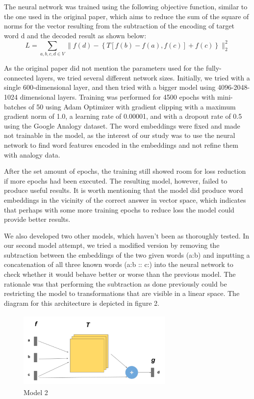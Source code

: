 \documentclass[11pt]{article}
\begin{document}
The neural network was trained using the following objective function,
similar to the one used in the original paper, which aims to reduce the
sum of the square of norms for the vector resulting from the subtraction
of the encoding of target word d and the decoded result as shown below:
$$L=\sum_{a,b,c,d \in V}\| f(d) - \left \{T[f(b)-f(a),f(c)]+f(c)\right \} \|_{2}^2$$

As the original paper did not mention the parameters used for the
fully-connected layers, we tried several different network sizes. Initially, we
tried with a single 600-dimensional layer, and then tried with a bigger model
using 4096-2048-1024 dimensional layers. Training was performed for 4500 epochs
with mini-batches of 50 using Adam Optimizer with gradient clipping with a
maximum gradient norm of 1.0, a learning rate of 0.00001, and with a dropout
rate of 0.5 using the Google Analogy dataset. The word embeddings were fixed and
made not trainable in the model, as the interest of our study was to use the
neural network to find word features encoded in the embeddings and not refine
them with analogy data.

After the set amount of epochs, the training still showed room for loss
reduction if more epochs had been executed. The resulting model, however, failed
to produce useful results. It is worth mentioning that the model did produce
word embeddings in the vicinity of the correct answer in vector space, which
indicates that perhaps with some more training epochs to reduce loss the model
could provide better results.

We also developed two other models, which haven't been as thoroughly tested. In
our second model attempt, we tried a modified version by removing the
subtraction between the embeddings of the two given words (a:b) and inputting a
concatenation of all three known words (a:b :: c:) into the neural network to
check whether it would behave better or worse than the previous model. The
rationale was that performing the subtraction as done previously could be
restricting the model to transformations that are visible in a linear space. The
diagram for this architecture is depicted in figure 2.

\begin{figure}
  \centering
\includegraphics[width=3.0in,height=1.5in]{./model_2.png}
  \caption{Model 2}
\end{figure}
\end{document}
